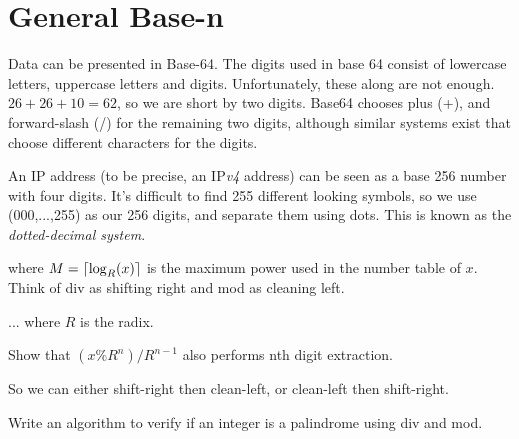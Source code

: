 \section{General Base-n}



\frmrule 

\begin{example}
Data can be presented in Base-64. The digits used in base 64 consist of lowercase letters, 
uppercase letters and digits. Unfortunately, these along are not enough.
$26 + 26 + 10 = 62$, so we are short by two digits. Base64 chooses plus (+), 
and forward-slash (/) for the remaining two digits, although similar systems 
exist that choose different characters for the digits.
\end{example}


\frmrule 

\begin{example}
An IP address (to be precise, an IP\textit{v4} address) can be seen as a 
base 256 number with four digits. It's difficult to find 
255 different looking symbols, so we use (000,...,255) as our 256 digits, 
and separate them using dots. This is known 
as the \textit{dotted-decimal system}.
\end{example}




where $M = \lceil\log_R(x)\rceil$ is the maximum power used in the number table of $x$. Think of div as shifting right and 
mod as cleaning left. 




... where $R$ is the radix. 

\begin{example}
Show that $(x \% R^{n}) / R^{n-1}$ also performs nth digit 
extraction.  
\end{example}
So we can either shift-right then clean-left, or clean-left then shift-right. 

\begin{example}
Write an algorithm to verify if an integer is a palindrome using div and mod.
\end{example}

